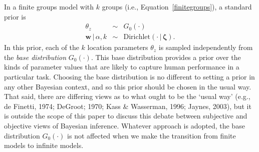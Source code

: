 \documentclass[authoryear]{elsarticle}
\newcommand{\condon}{\,|\,}
\newcommand{\vctr}[1]{\bm{#1}}
\begin{document}
In a finite groups model with $k$ groups (i.e., Equation~\ref{finitegroups}),
 a standard prior is
\begin{equation}
        \begin{array}{rcl}
        \theta_z & \sim & G_0(\cdot) \\
        \vctr{w} \condon \alpha, k & \sim &
        \mbox{Dirichlet}(\cdot \condon \vctr{\zeta}).
        \end{array}
        \label{finiteprior}
\end{equation}
\noindent In this prior, each of the $k$ location parameters $\theta_z$ is
sampled independently from the \emph{base distribution} $G_0(\cdot)$.
This base distribution provides a prior over the kinds of parameter values
that are likely to capture human performance in a particular task. Choosing
the base distribution is no different to setting a prior in any other Bayesian
context, and so this prior should be chosen in the usual way. That said,
there are differing views as to what ought to be the `usual way'
(e.g.,  de Finetti, 1974; DeGroot; 1970; Kass \& Wasserman, 1996;
Jaynes, 2003), but it is outside the scope of this paper to discuss this
debate between subjective and objective views of Bayesian inference.
Whatever approach is adopted, the base distribution $G_0(\cdot)$
is not affected when we make the transition from finite models
to infinite models.
\end{document}
